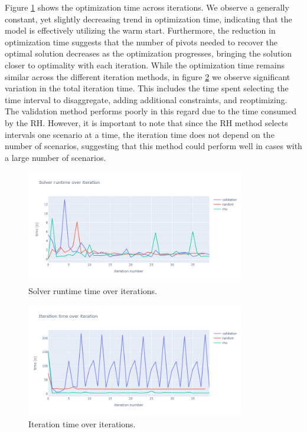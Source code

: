 \documentclass[smallextended,natbib]{svjour3}       %
\numberwithin{theorem}{section}
\begin{document}
Figure \ref{fig:opt_time_over_iter} shows the optimization time across iterations.
 We observe a generally constant, yet slightly decreasing trend in optimization time, indicating that the model is effectively utilizing the warm start. Furthermore, the reduction in optimization time suggests that the number of pivots needed to recover the optimal solution decreases as the optimization progresses, bringing the solution closer to optimality with each iteration.
 While the optimization time remains similar across the different iteration methods, in figure \ref{fig:iter_time_over_iter} we observe significant variation in the total iteration time. This includes the time spent selecting the time interval to disaggregate, adding additional constraints, and reoptimizing. 
 The validation method performs poorly in this regard due to the time consumed by the RH. However, it is important to note that since the RH method selects intervals one scenario at a time, the iteration time does not depend on the number of scenarios, suggesting that this method could perform well in cases with a large number of scenarios.
 

\begin{figure}[H]
  \centering
  \includegraphics[width=0.85\textwidth]{images/opt_time_over_iter.png}%
  \caption{Solver runtime time over iterations.}
  \label{fig:opt_time_over_iter}
\end{figure}

\begin{figure}[H]
  \centering
  \includegraphics[width=0.85\textwidth]{images/iter_time_over_iter.png}%
  \caption{Iteration time over iterations.}
  \label{fig:iter_time_over_iter}
\end{figure}
\end{document}
